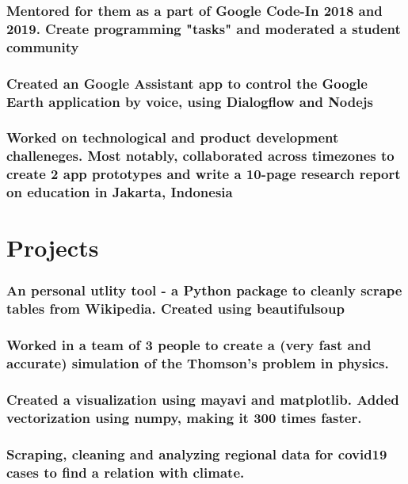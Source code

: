 \documentclass[a4paper]{resume}
\begin{document}
\subsubsection{Mentored for them as a part of Google Code-In 2018 and 2019. Create programming "tasks" and moderated a student community}
\subsubsection{Created an Google Assistant app to control the Google Earth application by voice, using Dialogflow and Nodejs}

\subsubsection{Worked on technological and product development challeneges. Most notably, collaborated across timezones to create 2 app prototypes and write a 10-page research report on education in Jakarta, Indonesia}

\section{Projects}
\subsubsection{An personal utlity tool - a Python package to cleanly scrape tables from Wikipedia. Created using beautifulsoup}

\subsubsection{Worked in a team of 3 people to create a (very fast and accurate) simulation of the Thomson's problem in physics.}
\subsubsection{Created a visualization using mayavi and matplotlib. Added vectorization using numpy, making it 300 times faster.}

\subsubsection{Scraping, cleaning and analyzing regional data for covid19 cases to find a relation with climate.}
\end{document}
